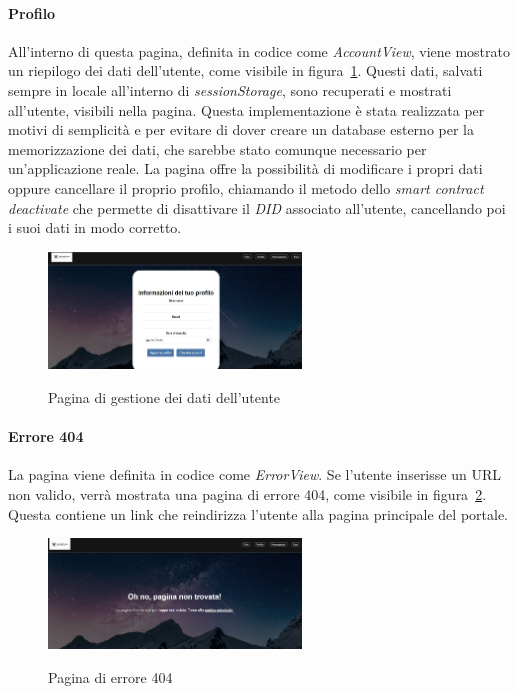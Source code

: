 \newpage
\paragraph{Profilo}\label{par:profilo}

All'interno di questa pagina, definita in codice come \textit{AccountView}, viene mostrato un riepilogo dei dati dell'utente, come visibile in figura~\ref{fig:profilo}.
Questi dati, salvati sempre in locale all'interno di \textit{sessionStorage}, sono recuperati e mostrati all'utente, visibili nella pagina. Questa implementazione è stata realizzata per motivi di semplicità 
e per evitare di dover creare un database esterno per la memorizzazione dei dati, che sarebbe stato comunque necessario per un'applicazione reale.
La pagina offre la possibilità di modificare i propri dati oppure cancellare il proprio profilo, chiamando il metodo dello \textit{smart contract} \textit{deactivate}
che permette di disattivare il \textit{DID} associato all'utente, cancellando poi i suoi dati in modo corretto.

\begin{figure}[ht]
    \centering
    \includegraphics[width=0.6\textwidth, alt={Schermata della pagina di gestione del profilo dell'utente}]{immagini/frontend/account.png}
    \caption{Pagina di gestione dei dati dell'utente}\label{fig:profilo}
\end{figure}

\paragraph{Errore 404}

La pagina viene definita in codice come \textit{ErrorView}.
Se l'utente inserisse un URL non valido, verrà mostrata una pagina di errore 404, come visibile in figura~\ref{fig:errore-404}.
Questa contiene un link che reindirizza l'utente alla pagina principale del portale.

\begin{figure}[ht]
    \centering
    \includegraphics[width=0.6\textwidth, alt={Schermata della pagina di errore 404}]{immagini/frontend/404.png}
    \caption{Pagina di errore 404}\label{fig:errore-404}
\end{figure}

